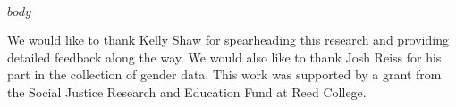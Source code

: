 \documentclass[sigconf]{acmart}
\begin{document}
\maketitle

$body$


\balance
\begin{acks}
We would like to thank Kelly Shaw for spearheading this research and providing detailed feedback along the way. We would also like to thank Josh Reiss for his part in the collection of gender data.
  This work was supported by a grant from the Social Justice Research and Education Fund at Reed College.
\end{acks}

\clearpage{}


\end{document}

